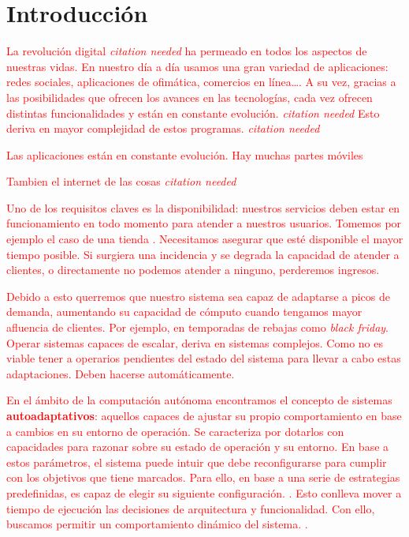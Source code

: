 
\chapter{Introducción}
\label{chap:introduccion}

\textcolor{red}{La revolución digital \emph{citation needed} ha permeado en todos los aspectos de nuestras vidas. En nuestro día a día usamos una gran variedad de aplicaciones: redes sociales, aplicaciones de ofimática, comercios en línea\dots. A su vez, gracias a las posibilidades que ofrecen los avances en las tecnologías, cada vez ofrecen distintas funcionalidades y están en constante evolución. \emph{citation needed} Esto deriva en mayor complejidad de estos programas. \emph{citation needed}}

\textcolor{red}{Las aplicaciones están en constante evolución. Hay muchas partes móviles}

\textcolor{red}{Tambien el internet de las cosas \emph{citation needed}}

\textcolor{red}{Uno de los requisitos claves es la disponibilidad: nuestros servicios deben estar en funcionamiento en todo momento para atender a nuestros usuarios. Tomemos por ejemplo el caso de una tienda . Necesitamos asegurar que esté disponible el mayor tiempo posible. Si surgiera una incidencia y se degrada la capacidad de atender a clientes, o directamente no podemos atender a ninguno, perderemos ingresos.}

\textcolor{red}{Debido a esto querremos que nuestro sistema sea capaz de adaptarse a picos de demanda, aumentando su capacidad de cómputo cuando tengamos mayor afluencia de clientes. Por ejemplo, en temporadas de rebajas como \emph{black friday}. Operar sistemas capaces de escalar, deriva en sistemas complejos. Como no es viable tener a operarios pendientes del estado del sistema para llevar a cabo estas adaptaciones. Deben hacerse automáticamente.}

\textcolor{red}{En el ámbito de la computación autónoma encontramos el concepto de sistemas \textbf{autoadaptativos}: aquellos capaces de ajustar su propio comportamiento en base a cambios en su entorno de operación. Se caracteriza por dotarlos con capacidades para razonar sobre su estado de operación y su entorno. En base a estos parámetros, el sistema puede intuir que debe reconfigurarse para cumplir con los objetivos que tiene marcados. Para ello, en base a una serie de estrategias predefinidas, es capaz de elegir su siguiente configuración. \cite{garlanIncreasingSystemDependability2003}. Esto conlleva mover a tiempo de ejecución las decisiones de arquitectura y funcionalidad. Con ello, buscamos permitir un comportamiento dinámico del sistema. \cite{brunEngineeringSelfAdaptiveSystems2009}.}

